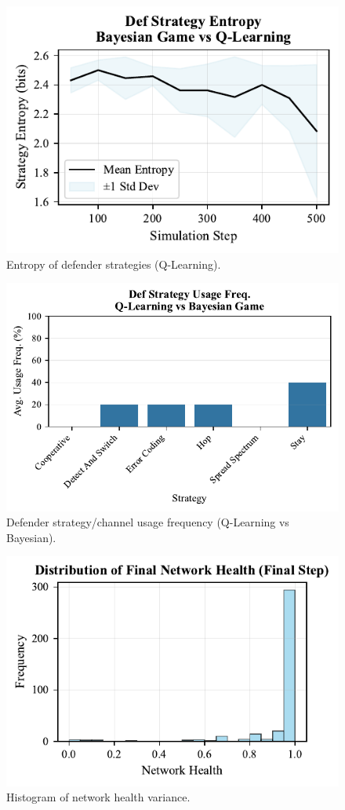 \documentclass[conference]{IEEEtran}
\begin{document}
\begin{figure}[h!]
    \centering
    \includegraphics[width=0.9\linewidth]{figures/appendix/fig_entropy_def_Q_learning.pdf}
    \caption{Entropy of defender strategies (Q-Learning).}
\end{figure}

\begin{figure}[h!]
    \centering
    \includegraphics[width=0.9\linewidth]{figures/appendix/fig_freq_def_QL_vs_Bayes.pdf}
    \caption{Defender strategy/channel usage frequency (Q-Learning vs Bayesian).}
\end{figure}

\begin{figure}[h!]
    \centering
    \includegraphics[width=0.9\linewidth]{figures/appendix/fig_health_variance_histogram.pdf}
    \caption{Histogram of network health variance.}
\end{figure}
\end{document}
